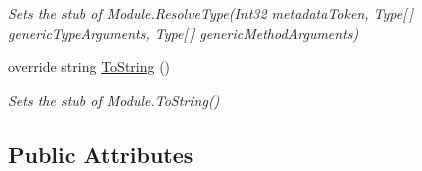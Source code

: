 \begin{DoxyCompactItemize}
\begin{DoxyCompactList}\small\item\em Sets the stub of Module.\-Resolve\-Type(\-Int32 metadata\-Token, Type\mbox{[}$\,$\mbox{]} generic\-Type\-Arguments, Type\mbox{[}$\,$\mbox{]} generic\-Method\-Arguments)\end{DoxyCompactList}\item 
override string \hyperlink{class_system_1_1_reflection_1_1_fakes_1_1_stub_module_ad5f826cc99188efa682101f8a3e4cf6f}{To\-String} ()
\begin{DoxyCompactList}\small\item\em Sets the stub of Module.\-To\-String()\end{DoxyCompactList}\end{DoxyCompactItemize}
\subsection*{Public Attributes}
